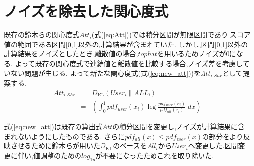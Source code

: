 \section{ノイズを除去した関心度式}
\label{sc:att_shr}
既存の鈴木らの関心度式$Att_i$(式(\ref{eq:Att}))では積分区間が無限区間であり,スコア値の範囲である区間[0,1]以外の計算結果が含まれていた.
しかし,区間[0,1]以外の計算結果をノイズとしたとき,離散値の場合,$tophat$を用いるためノイズが0になる.
よって既存の関心度式で連続値と離散値を比較する場合,ノイズ差を考慮していない問題が生じる.
よって新たな関心度式(式(\ref{eq:new_att}))を$Att_{i\_Shr}$として提案する.
\begin{eqnarray}
     \label{eq:new_att}
     {Att}_{i\_Shr} &=& D_{\mathrm{KL}}(User_i\|ALL_i) \nonumber \\
               &=& (\int_{0}^{1} pdf_{user}(x_{i}) \log \frac{pdf_{user}(x_{i})}{pdf_{all}(x_{i})} \; dx)
 \end{eqnarray}
 \par
 式(\ref{eq:new_att})は既存の算出式$Att$の積分区間を変更し,ノイズが計算結果に含まれないようにしたものである.
 さらに$pdf_{all}(x)\leq pdf_{user}(x)$の部分をより反映させるために鈴木らが用いた$D_{\mathrm{KL}}$のベースを$All_i$から$User_i$へ変更した.区間変更に伴い,値調整のための$log_{1p}$が不要になったためこれを取り除いた.

